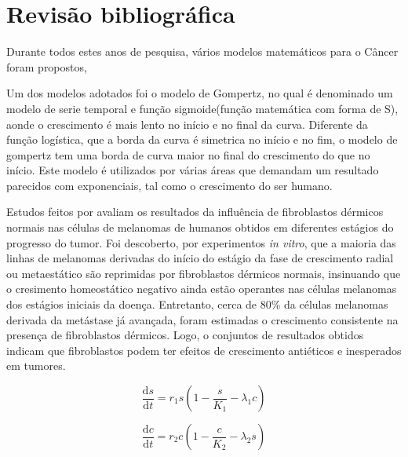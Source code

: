 \documentclass[12pt]{article}
\begin{document}
\section{Revisão bibliográfica} \label{sec:relatedwork} %
Durante todos estes anos de pesquisa, vários modelos matemáticos para o Câncer foram propostos,

Um dos modelos adotados foi o modelo de Gompertz, no qual é denominado um modelo de serie temporal e função sigmoide(função matemática com forma de S), aonde o crescimento é mais lento no início e no final da curva. Diferente da função logística, que a borda da curva é simetrica no início e no fim, o modelo de gompertz tem uma borda de curva maior no final do crescimento do que no início. Este modelo é utilizados por várias áreas que demandam um resultado parecidos com exponenciais, tal como o crescimento do ser humano.


Estudos feitos por \cite{Cornil1991} avaliam os resultados da influência de fibroblastos dérmicos normais nas células de melanomas de humanos obtidos em diferentes estágios do progresso do tumor. Foi descoberto, por experimentos \textit{in vitro}, que a maioria das linhas de melanomas derivadas do início do estágio da fase de crescimento radial ou metaestático são reprimidas por fibroblastos dérmicos normais, insinuando que o cresimento homeostático negativo ainda estão operantes nas células melanomas dos estágios iniciais da doença. Entretanto, cerca de 80\% da células melanomas derivada da metástase já avançada, foram estimadas o crescimento consistente na presença de fibroblastos dérmicos. Logo, o conjuntos de resultados obtidos indicam que fibroblastos podem ter efeitos de crescimento antiéticos e inesperados em tumores.

\begin{equation} \label{eq:normalgrowth}
  \frac{\mathrm{d} s}{\mathrm{d} t} = r_{1} s \left ( 1 - \frac{s}{K_1} - \lambda_{1} c \right )
\end{equation}

\begin{equation} \label{eq:cancergrowth}
  \frac{\mathrm{d} c}{\mathrm{d} t} = r_{2} c \left ( 1 - \frac{c}{K_2} - \lambda_{2} s \right )
\end{equation}
\end{document}
